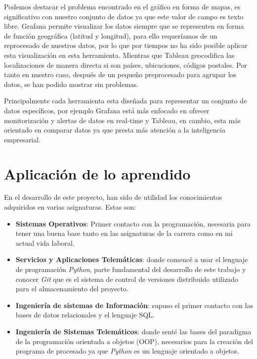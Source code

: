 \documentclass[a4paper, 12pt]{book}
\begin{document}
Podemos destacar el problema encontrado en el gráfico en forma de mapas, es significativo con nuestro conjunto de datos ya que este valor de campo es texto libre. Grafana permite visualizar los datos siempre que se representen en forma de función geográfica (latitud y longitud), para ello requeríamos de un reprocesado de nuestros datos, por lo que por tiempos no ha sido posible aplicar esta visualización en esta herramienta. Mientras que Tableau geocodifica las localizaciones de manera directa si son países, ubicaciones, códigos postales. Por tanto en nuestro caso, después de un pequeño preprocesado para agrupar los datos, se han podido mostrar sin problemas.

Principalmente cada herramienta esta diseñada para representar un conjunto de datos específicos, por ejemplo Grafana está más enfocado en ofrecer monitorización y alertas de datos en real-time y Tableau, en cambio, esta más orientado en comparar datos ya que presta más atención a la inteligencia empresarial.



\section{Aplicación de lo aprendido}
\label{sec:aplicacion}

En el desarrollo de este proyecto, han sido de utilidad los conocimientos adquiridos en varias asignaturas. Estas son:

\begin{itemize}
  \item \textbf{Sistemas Operativos}: Primer contacto con la programación, necesaria para tener una buena base tanto en las asignaturas de la carrera como en mi actual vida laboral. 
  \item \textbf{Servicios y Aplicaciones Telemáticas}: donde comencé a usar el lenguaje de programación \emph{Python}, parte fundamental del desarrollo de este trabajo y conocer \emph{Git} que es el sistema de control de versiones distribuido utilizado para el almacenamiento del proyecto. 
  \item \textbf{Ingeniería de sistemas de Información}: supuso el primer contacto con las bases de datos relacionales y el lenguaje SQL.
  \item \textbf{Ingeniería de Sistemas Telemáticos}: donde senté las bases del paradigma de la programación orientada a objetos (OOP), necesarios para la creación del programa de procesado ya que \emph{Python} es un lenguaje orientado a objetos.
\end{itemize}
\end{document}
